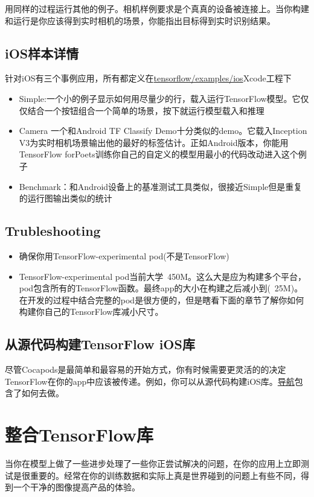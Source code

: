 用同样的过程运行其他的例子。相机样例要求是个真真的设备被连接上。当你构建和运行是你应该得到实时相机的场景，你能指出目标得到实时识别结果。
\subsection{iOS样本详情}
针对iOS有三个事例应用，所有都定义在\href{https://www.github.com/tensorflow/tensorflow/blob/r1.4/tensorflow/examples/ios/}{tensorflow/examples/ios}Xcode工程下
\begin{itemize}
\item Simple:一个小的例子显示如何用尽量少的行，载入运行TensorFlow模型。它仅仅结合一个按钮组合一个简单的场景，按下就运行模型载入和推理
\item Camera 一个和Android TF Classify Demo十分类似的demo。它载入Inception V3为实时相机场景输出他的最好的标签估计。正如Android版本，你能用TensorFlow forPoets训练你自己的自定义的模型用最小的代码改动进入这个例子
\item Benchmark：和Android设备上的基准测试工具类似，很接近Simple但是重复的运行图输出类似的统计
\end{itemize}
\subsection{Trubleshooting}
\begin{itemize}
\item 确保你用TensorFlow-experimental pod(不是TensorFlow)
\item TensorFlow-experimental pod当前大学~450M。这么大是应为构建多个平台，pod包含所有的TensorFlow函数。最终app的大小在构建之后减小到(~25M)。在开发的过程中结合完整的pod是很方便的，但是瞎看下面的章节了解你如何构建你自己的TensorFlow库减小尺寸。
\end{itemize}
\subsection{从源代码构建TensorFlow iOS库}
尽管Cocapods是最简单和最容易的开始方式，你有时候需要更灵活的的决定TensorFlow在你的app中应该被传递。例如，你可以从源代码构建iOS库。\href{https://github.com/tensorflow/tensorflow/tree/master/tensorflow/examples/ios#building-the-tensorflow-ios-libraries-from-source}{导航}包含了如何去做。
\section{整合TensorFlow库}
当你在模型上做了一些进步处理了一些你正尝试解决的问题，在你的应用上立即测试是很重要的。经常在你的训练数据和实际上真是世界碰到的问题上有些不同，得到一个干净的图像提高产品的体验。

